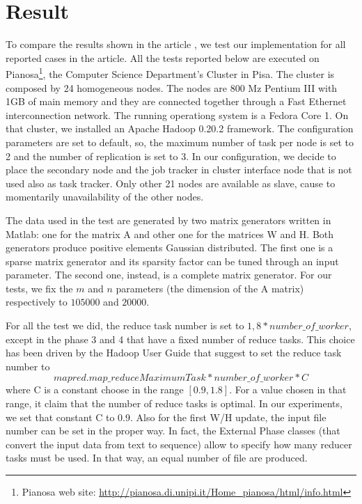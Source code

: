 \section{Result}
\label{result}

To compare the results shown in the article \cite{liu2010}, we test our implementation for all reported cases in the article. All the tests reported below are executed on Pianosa\footnote{Pianosa web site: \url{http://pianosa.di.unipi.it/Home_pianosa/html/info.html}}, the Computer Science Department's Cluster in Pisa. The cluster is composed by 24 homogeneous nodes. The nodes are 800 Mz Pentium III with 1GB of main memory and they are connected together through a Fast Ethernet interconnection network. The running operationg system is a Fedora Core 1. On that cluster, we installed an Apache Hadoop 0.20.2 framework. The configuration parameters are set to default, so, the maximum number of task per node is set to 2 and the number of replication is set to 3. In our configuration, we decide to place the secondary node and the job tracker in cluster interface node that is not used also as task tracker. Only other 21 nodes are available as slave, cause to momentarily unavailability of the other nodes.

The data used in the test are generated by two matrix generators written in Matlab: one for the matrix A and other one for the matrices W and H. Both generators produce positive elements Gaussian distributed. The first one is a sparse matrix generator and its sparsity factor can be tuned through an input parameter. The second one, instead, is a complete matrix generator. For our tests, we fix the $m$ and $n$ parameters (the dimension of the A matrix) respectively to $105000$ and $20000$.

For all the test we did, the reduce task number is set to $ 1,8 * number\_of\_worker$, except in the phase 3 and 4 that have a fixed number of reduce tasks. This choice has been driven by the Hadoop User Guide that suggest to set the reduce task number to $$ mapred.map\_reduceMaximumTask * number\_of\_worker * C $$ where C is a constant choose in the range $[ 0.9, 1.8]$. For a value chosen in that range, it claim that the number of reduce tasks is optimal. In our experiments, we set that constant C to 0.9. Also for the first  W/H update, the input file number can be set in the proper way. In fact, the External Phase classes (that convert the input data from text to sequence) allow to specify how many reducer tasks must be used. In that way, an equal number of file are produced.

